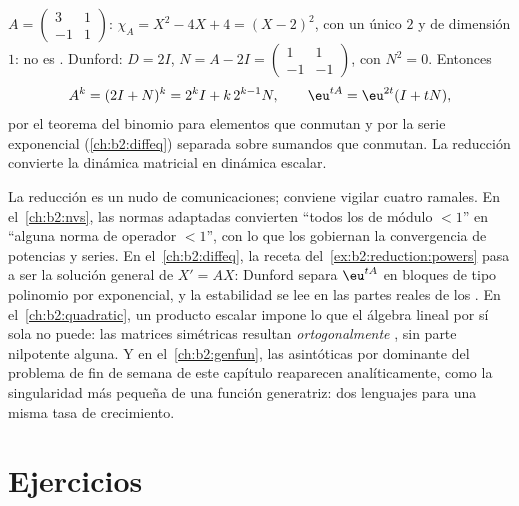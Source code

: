 \begin{example}\label{ex:b2:reduction:powers}
$A = \begin{pmatrix} 3 & 1\\ -1 & 1\end{pmatrix}$: $\chi_A = X^2 -
4X + 4 = (X-2)^2$, con un único  $2$ y  de dimensión $1$: no es . Dunford: $D = 2I$,
$N = A - 2I = \begin{pmatrix} 1 & 1\\ -1 & -1\end{pmatrix}$, con
$N^2 = 0$. Entonces
\[
A^k = (2I + N)^k = 2^k I + k\,2^{k-1} N ,
\qquad
\eu^{tA} = \eu^{2t}(I + tN),
\]
por el teorema del binomio para elementos que conmutan y por la
serie exponencial (\cref{ch:b2:diffeq}) separada sobre sumandos que
conmutan. La reducción convierte la dinámica matricial en dinámica
escalar.
\end{example}

\begin{remark}\label{rem:b2:reduction:perspectives}
La reducción es un nudo de comunicaciones; conviene vigilar cuatro
ramales. En el~\cref{ch:b2:nvs}, las normas adaptadas convierten
``todos los  de módulo $< 1$'' en ``alguna norma de
operador $< 1$'', con lo que los  gobiernan la convergencia
de potencias y series. En el~\cref{ch:b2:diffeq}, la receta del~\cref{ex:b2:reduction:powers} pasa a ser la solución general de $X'
= AX$: Dunford separa $\eu^{tA}$ en bloques de tipo polinomio por
exponencial, y la estabilidad se lee en las partes reales de los
. En el~\cref{ch:b2:quadratic}, un producto escalar
impone lo que el álgebra lineal por sí sola no puede: las matrices
simétricas resultan \emph{ortogonalmente} , sin parte
nilpotente alguna. Y en el~\cref{ch:b2:genfun}, las asintóticas por
 dominante del problema de fin de semana de este
capítulo reaparecen analíticamente, como la singularidad más pequeña
de una función generatriz: dos lenguajes para una misma tasa de
crecimiento.
\end{remark}

\section{Ejercicios}

